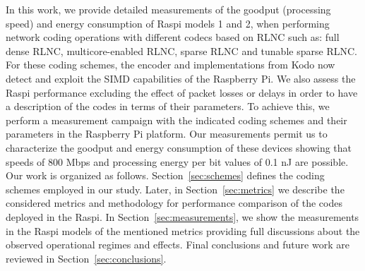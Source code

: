 In this work, we provide detailed measurements of the goodput (processing
speed) and energy consumption of \ac{Raspi} models 1 and 2, when
performing network coding operations with different codecs based on \ac{RLNC}
such as: full dense \ac{RLNC}, multicore-enabled \ac{RLNC}, sparse \ac{RLNC}
and tunable sparse \ac{RLNC}. For these coding schemes, the encoder and implementations from Kodo now detect and exploit the \ac{SIMD}
capabilities of the Raspberry Pi. We also assess the \ac{Raspi}
performance excluding the effect of packet losses or delays in order to have a
description of the codes in terms of their parameters. To achieve this,
we perform a measurement campaign with the indicated coding schemes and
their parameters in the Raspberry Pi platform. Our measurements permit
us to characterize the goodput and energy consumption
of these devices showing that speeds of 800 Mbps and processing energy per bit
values of 0.1 nJ are possible. Our work is organized as follows.
Section~\ref{sec:schemes} defines the
coding schemes employed in our study. Later, in Section~\ref{sec:metrics}
we describe the considered metrics and methodology for performance comparison
of the codes deployed in the \ac{Raspi}. In Section~\ref{sec:measurements}, we
show the measurements in the \ac{Raspi} models of the mentioned metrics
providing full discussions about the observed operational regimes and effects.
Final conclusions and future work are reviewed in
Section~\ref{sec:conclusions}.

